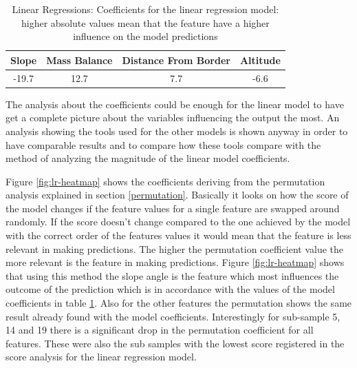 \begin{table}
	\centering
	\caption{Linear Regressions: Coefficients for the linear regression model: higher absolute values mean that the feature have a higher influence on the model predictions}
	\begin{tabular}{|c|c|c|c|}
		\hline 
		Slope&Mass Balance&Distance From Border&Altitude \\
		\hline
		-19.7&12.7&7.7&-6.6 \\
		\hline
	\end{tabular}
	\label{tb:lr-coef}
\end{table}

The analysis about the coefficients could be enough for the linear model to have get a complete picture about the variables influencing the output the most. An analysis showing the tools used for the other models is shown anyway in order to have comparable results and to compare how these tools compare with the method of analyzing the magnitude of the linear model coefficients. 

Figure \ref{fig:lr-heatmap} shows the coefficients deriving from the permutation analysis explained in section \ref{permutation}. Basically it looks on how the score of the model changes if the feature values for a single feature are swapped around randomly. If the score doesn't change compared to the one achieved by the model with the correct order of the features values it would mean that the feature is less relevant in making predictions. The higher the permutation coefficient value the more relevant is the feature in making predictions. Figure \ref{fig:lr-heatmap} shows that using this method the slope angle is the feature which most influences the outcome of the prediction which is in accordance with the values of the model coefficients in table \ref{tb:lr-coef}. Also for the other features the permutation shows the same result already found with the model coefficients. Interestingly for sub-sample 5, 14 and 19 there is a significant drop in the permutation coefficient for all features. These were also the sub samples with the lowest score registered in the score analysis for the linear regression model.

